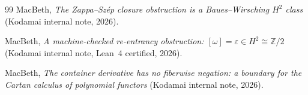 \documentclass[11pt]{article}
\theoremstyle{definition}
\newcommand{\Z}{\mathbb{Z}}
\begin{document}
\begin{thebibliography}{99}
MacBeth,
\emph{The Zappa--Sz\'ep closure obstruction is a Baues--Wirsching $H^2$ class}
(Kodamai internal note, 2026).

MacBeth,
\emph{A machine-checked re-entrancy obstruction: $[\omega]=\varepsilon\in H^2\cong\Z/2$}
(Kodamai internal note, Lean~4 certified, 2026).

MacBeth,
\emph{The container derivative has no fiberwise negation: a boundary for the Cartan calculus of
polynomial functors}
(Kodamai internal note, 2026).

\end{thebibliography}
\end{document}
